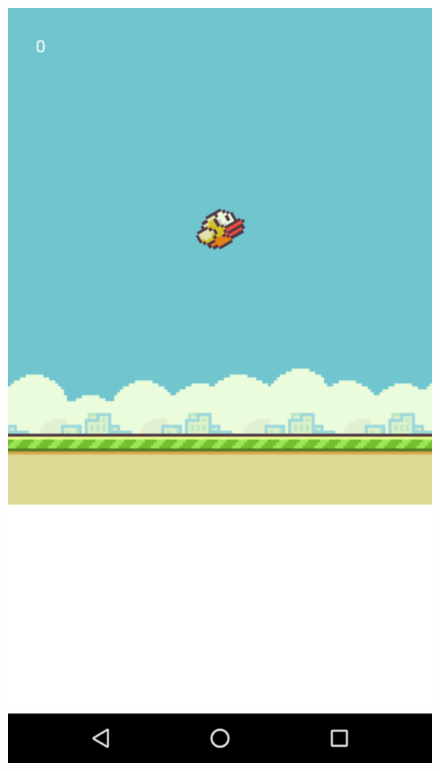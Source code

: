 \documentclass[twoside]{report}
\begin{document}
\begin{figure}[H]
\begin{center}
\includegraphics[scale=0.25]{images/userguide/29.png}

\end{center}
\end{figure}
\end{document}
